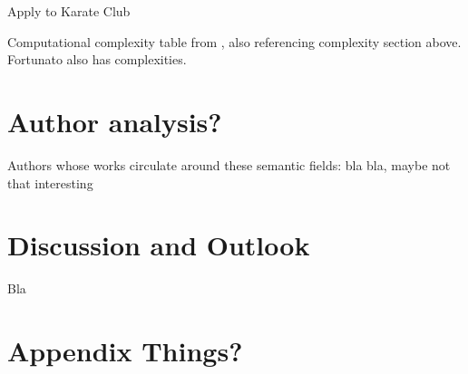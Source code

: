 \documentclass[12pt, a4paper]{article}
\begin{document}
  Apply to Karate Club

  Computational complexity table from \cite{watset}, also referencing complexity section above. Fortunato also has complexities.

  \section{Author analysis?}
  Authors whose works circulate around these semantic fields:
  bla bla, maybe not that interesting

  \pagebreak
  \section{Discussion and Outlook}
  Bla

  \pagebreak
  \printbibliography

  \appendix
  \section{Appendix Things?}
\end{document}
